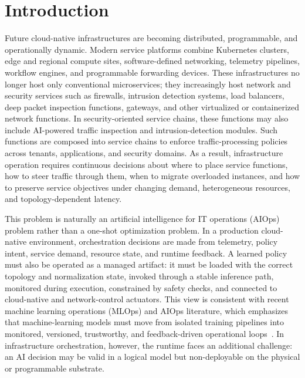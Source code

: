 \documentclass[final,5p]{elsarticle}
\newcommand{\rev}[1]{\textcolor{revisiongreen}{#1}}
\let\newrev\rev
\begin{document}
\section{Introduction}
\label{sec:introduction}

Future cloud-native infrastructures are becoming distributed, programmable, and operationally dynamic. Modern service platforms combine Kubernetes clusters, edge and regional compute sites, software-defined networking, telemetry pipelines, workflow engines, and programmable forwarding devices. These infrastructures no longer host only conventional microservices; they increasingly host network and security services such as firewalls, intrusion detection systems, load balancers, deep packet inspection functions, gateways, and other virtualized or containerized network functions. \newrev{In security-oriented service chains, these functions may also include AI-powered traffic inspection and intrusion-detection modules.} Such functions are composed into service chains to enforce traffic-processing policies across tenants, applications, and security domains. As a result, infrastructure operation requires continuous decisions about where to place service functions, how to steer traffic through them, when to migrate overloaded instances, and how to preserve service objectives under changing demand, heterogeneous resources, and topology-dependent latency.

This problem is naturally an \rev{artificial intelligence for IT operations (AIOps)} problem rather than a one-shot optimization problem. In a production cloud-native environment, orchestration decisions are made from telemetry, policy intent, service demand, resource state, and runtime feedback. A learned policy must also be operated as a managed artifact: it must be loaded with the correct topology and normalization state, invoked through a stable inference path, monitored during execution, constrained by safety checks, and connected to cloud-native and network-control actuators. This view is consistent with recent \rev{machine learning operations (MLOps)} and AIOps literature, which emphasizes that machine-learning models must move from isolated training pipelines into monitored, versioned, trustworthy, and feedback-driven operational loops~\cite{kreuzberger2023mlops,diazdearcaya2024joint,eken2025mlops,bayram2025trustworthy,zhang2025aiopsllm,eramo2024architecture}. In infrastructure orchestration, however, the runtime faces an additional challenge: an AI decision may be valid in a logical model but non-deployable on the physical or programmable substrate.
\end{document}
